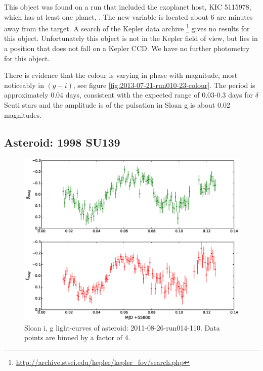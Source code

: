 
This object was found on a run that included the exoplanet host, KIC 5115978, which has at least one planet, \citep{KIC5115978}. The new variable is located about 6 arc minutes away from the target. A search of the Kepler data archive \footnote{\url{http://archive.stsci.edu/kepler/kepler_fov/search.php}} gives no results for this object. Unfortunately this object is not in the Kepler field of view, but lies in a position that does not fall on a Kepler CCD. We have no further photometry for this object. 

There is evidence that the colour is varying in phase with magnitude, most noticeably in $(g - i)$, see figure \ref{fig:2013-07-21-run010-23-colour}. The period is approximately 0.04 days, consistent with the expected range of 0.03-0.3 days for $\delta$ Scuti stars and the amplitude is of the pulsation in Sloan g is about 0.02 magnitudes.

\subsection{Asteroid: 1998 SU139}

\begin{figure}
  \center
  \includegraphics[width=140mm]{images/2011-08-26-run014-110-lightcurve-bin4.eps} 
  \caption{Sloan i, g light-curves of asteroid: 2011-08-26-run014-110. Data points are binned by a factor of 4.}
  \label{fig:2011-08-26-run014-110}
\end{figure}


